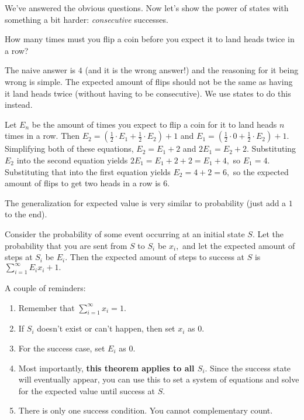 \documentclass{article}
\begin{document}
We've answered the obvious questions. Now let's show the power of states with something a bit harder: \textit{consecutive} successes.

\begin{exam}
How many times must you flip a coin before you expect it to land heads twice in a row?
\end{exam}

The naive answer is $4$ (and it is the wrong answer!) and the reasoning for it being wrong is simple. The expected amount of flips should not be the same as having it land heads twice (without having to be consecutive). We use states to do this instead.

\begin{sol}
Let $E_n$ be the amount of times you expect to flip a coin for it to land heads $n$ times in a row. Then $E_2=(\frac{1}{2}\cdot E_1+\frac{1}{2}\cdot E_2)+1$ and $E_1=(\frac{1}{2}\cdot 0+\frac{1}{2}\cdot E_2)+1.$ Simplifying both of these equations, $E_2=E_1+2$ and $2E_1=E_2+2.$ Substituting $E_2$ into the second equation yields $2E_1=E_1+2+2=E_1+4,$ so $E_1=4.$ Substituting that into the first equation yields $E_2=4+2=6,$ so the expected amount of flips to get two heads in a row is $6.$
\end{sol}

The generalization for expected value is very similar to probability (just add a $1$ to the end).

\begin{theo}
Consider the probability of some event occurring at an initial state $S.$ Let the probability that you are sent from $S$ to $S_i$ be $x_i,$ and let the expected amount of steps at $S_i$ be $E_i.$ Then the expected amount of steps to success at $S$ is $\sum\limits_{i=1}^{\infty}E_ix_i+1.$
\end{theo}

A couple of reminders:

\begin{enumerate}

    \item Remember that $\sum\limits_{i=1}^{\infty}x_i=1.$
    
    \item If $S_i$ doesn't exist or can't happen, then set $x_i$ as $0.$
    
    \item For the success case, set $E_i$ as $0.$
    
    \item Most importantly, \textbf{this theorem applies to all $S_i.$} Since the success state will eventually appear, you can use this to set a system of equations and solve for the expected value until success at $S.$
    
    \item There is only one success condition. You cannot complementary count.
\end{enumerate}
\end{document}
